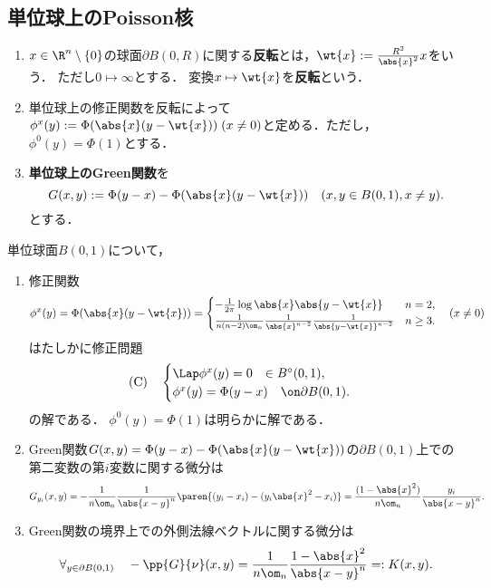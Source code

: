 \documentclass[uplatex,dvipdfmx]{jsreport}
\begin{document}
\subsection{単位球上のPoisson核}

\begin{definition}[単位球上のGreen関数]\mbox{}
    \begin{enumerate}
        \item $x\in\R^n\setminus\{0\}$の球面$\partial B(0,R)$に関する\textbf{反転}とは，$\wt{x}:=\frac{R^2}{\abs{x}^2}x$をいう．
        ただし$0\mapsto\infty$とする．
        変換$x\mapsto\wt{x}$を\textbf{反転}という．
        \item 単位球上の修正関数を反転によって$\phi^x(y):=\Phi(\abs{x}(y-\wt{x}))\;(x\ne0)$と定める．ただし，$\phi^0(y)=\Phi(1)$とする．
        \item \textbf{単位球上のGreen関数}を\[G(x,y):=\Phi(y-x)-\Phi(\abs{x}(y-\wt{x}))\quad(x,y\in B(0,1),x\ne y).\]
        とする．
    \end{enumerate}
\end{definition}
\begin{lemma}
    単位球面$B(0,1)$について，
    \begin{enumerate}
        \item 修正関数
        \[\phi^x(y)=\Phi(\abs{x}(y-\wt{x}))=\begin{cases}
            -\frac{1}{2\pi}\log\abs{x}\abs{y-\wt{x}}&n=2,\\
            \frac{1}{n(n-2)\om_n}\frac{1}{\abs{x}^{n-2}}\frac{1}{\abs{y-\wt{x}}^{n-2}}&n\ge3.
        \end{cases}\quad(x\ne0)\]
        はたしかに修正問題
        \[\text{(C)}\quad\begin{cases}
            \Lap\phi^x(y)=0\quad\mathrm{\in}\;B^\circ(0,1),\\
            \phi^x(y)=\Phi(y-x)\quad\on\partial B(0,1).
        \end{cases}\]
        の解である．
        $\phi^0(y)=\Phi(1)$は明らかに解である．
        \item Green関数$G(x,y)=\Phi(y-x)-\Phi(\abs{x}(y-\wt{x}))$の$\partial B(0,1)$上での第二変数の第$i$変数に関する微分は
        \[G_{y_i}(x,y)=-\frac{1}{n\om_n}\frac{1}{\abs{x-y}^n}\paren{(y_i-x_i)-(y_i\abs{x}^2-x_i)}=\frac{(1-\abs{x}^2)}{n\om_n}\frac{y_i}{\abs{x-y}^n}.\]
        \item Green関数の境界上での外側法線ベクトルに関する微分は
        \[\forall_{y\in\partial B(0,1)}\quad-\pp{G}{\nu}(x,y)=\frac{1}{n\om_n}\frac{1-\abs{x}^2}{\abs{x-y}^n}=:K(x,y).\]
    \end{enumerate}
\end{lemma}
\end{document}
